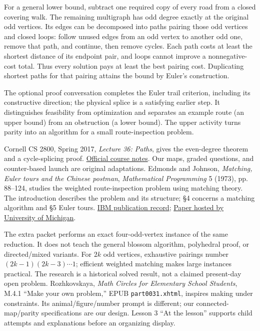 \documentclass[11pt]{article}
\begin{document}
For a general lower bound, subtract one required copy of every road from a closed covering walk. The remaining multigraph has odd degree exactly at the original odd vertices. Its edges can be decomposed into paths pairing those odd vertices and closed loops: follow unused edges from an odd vertex to another odd one, remove that path, and continue, then remove cycles. Each path costs at least the shortest distance of its endpoint pair, and loops cannot improve a nonnegative-cost total. Thus every solution pays at least the best pairing cost. Duplicating shortest paths for that pairing attains the bound by Euler's construction.

\newpage

The optional proof conversation completes the Euler trail criterion, including its constructive direction; the physical splice is a satisfying earlier step. It distinguishes feasibility from optimization and separates an example route (an upper bound) from an obstruction (a lower bound). The upper activity turns parity into an algorithm for a small route-inspection problem.

Cornell CS 2800, Spring 2017, \emph{Lecture 36: Paths}, gives the even-degree theorem and a cycle-splicing proof. \href{https://www.cs.cornell.edu/courses/cs2800/2017sp/lectures/lec36-graphs2.html}{Official course notes}. Our maps, graded questions, and counter-based launch are original adaptations.
Edmonds and Johnson, \emph{Matching, Euler tours and the Chinese postman}, \emph{Mathematical Programming} 5 (1973), pp. 88--124, studies the weighted route-inspection problem using matching theory. The introduction describes the problem and its structure; \S4 concerns a matching algorithm and \S5 Euler tours. \href{https://research.ibm.com/publications/matching-euler-tours-and-the-chinese-postman}{IBM publication record}; \href{https://web.eecs.umich.edu/~pettie/matching/Edmonds-Johnson-chinese-postman.pdf}{Paper hosted by University of Michigan}.

The extra packet performs an exact four-odd-vertex instance of the same reduction. It does not teach the general blossom algorithm, polyhedral proof, or directed/mixed variants. For $2k$ odd vertices, exhaustive pairings number $(2k-1)(2k-3)\cdots1$; efficient weighted matching makes large instances practical. The research is a historical solved result, not a claimed present-day open problem.
Rozhkovskaya, \emph{Math Circles for Elementary School Students}, M.4.1 ``Make your own problem,'' EPUB \texttt{part0031.xhtml}, inspires making under constraints. Its animal/figure/number prompt is different; our connected-map/parity specifications are our design. Lesson 3 ``At the lesson'' supports child attempts and explanations before an organizing display.
\end{document}
